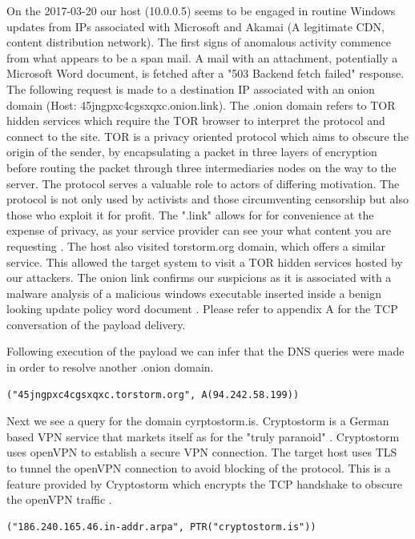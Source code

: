\documentclass[11pt]{diazessay} %
\begin{document}
On the 2017-03-20 our host (10.0.0.5) seems to be engaged in routine Windows updates from IPs associated with Microsoft and Akamai (A legitimate CDN, content distribution network). The first signs of anomalous activity commence from what appears to be a span mail. A mail with an attachment, potentially a Microsoft Word document, is fetched after a "503 Backend fetch failed" response. The following request is made to a destination IP associated with an onion domain (Host: 45jngpxc4cgsxqxc.onion.link). The .onion domain refers to TOR hidden services which require the TOR browser to interpret the protocol and connect to the site. TOR is a privacy oriented protocol which aims to obscure the origin of the sender, by encapsulating a packet in three layers of encryption before routing the packet through three intermediaries nodes on the way to the server. The protocol serves a valuable role to actors of differing motivation. The protocol is not only used by activists and those circumventing censorship but also those who exploit it for profit. The ".link" allows for for convenience at the expense of privacy, as your service provider can see your what content you are requesting \cite{onionlink}. The host also visited  torstorm.org domain, which offers a similar service. This allowed the target system to visit a TOR hidden services hosted by our attackers. The onion link confirms our suspicions as it is associated with a malware analysis of a malicious windows executable inserted inside a benign looking update policy word document \cite{hybrid}. Please refer to appendix A for the TCP conversation of the payload delivery.

Following execution of the payload we can infer that the DNS queries were made in order to resolve another .onion domain.

\begin{lstlisting}[language=html]
("45jngpxc4cgsxqxc.torstorm.org", A(94.242.58.199))
\end{lstlisting}

Next we see a query for the domain cyrptostorm.is. Cryptostorm is a German based VPN service that markets itself as for the "truly paranoid" \cite{cryptostorm}. Cryptostorm uses openVPN to establish a secure VPN connection. The target host uses TLS to tunnel the openVPN connection to avoid blocking of the protocol. This is a feature provided by Cryptostorm which encrypts the TCP handshake to obscure the openVPN traffic \cite{tls}. 

\begin{lstlisting}
("186.240.165.46.in-addr.arpa", PTR("cryptostorm.is"))
\end{lstlisting}
\end{document}
